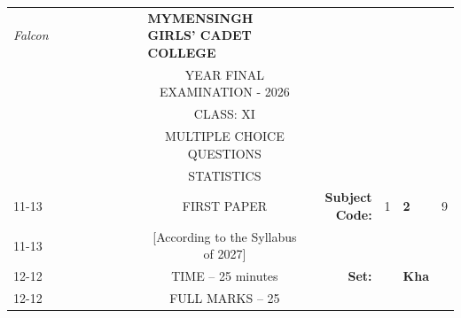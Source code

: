 \documentclass[12pt]{exam}
\begin{document}
\begin{table}[]
\begin{tabular}{llllllllcllll}
\textit{Falcon} &  &  &  &  &  &  &  & \multicolumn{1}{l}{\textbf{MYMENSINGH GIRLS' CADET COLLEGE}} &                                             &                        &                                 &                        \\
                &  &  &  &  &  &  &  & \multicolumn{1}{c}{YEAR FINAL EXAMINATION - 2026}       &                                             &                        & \multicolumn{1}{c}{}            &                        \\
                &  &  &  &  &  &  &  & CLASS: XI                                                   &                                             &                        & \multicolumn{1}{c}{}            &                        \\
                &  &  &  &  &  &  &  & MULTIPLE CHOICE QUESTIONS                                    &                                             &                        & \multicolumn{1}{c}{}            &                        \\
                &  &  &  &  &  &  &  & STATISTICS                                                   &                                             &                        & \multicolumn{1}{r}{}            &                        \\ \cline{11-13} 
                &  &  &  &  &  &  &  & FIRST PAPER                                                 & \multicolumn{1}{r|}{\textbf{Subject Code:}} & \multicolumn{1}{l|}{1} & \multicolumn{1}{l|}{\textbf{2}} & \multicolumn{1}{l|}{9} \\ \cline{11-13} 
                &  &  &  &  &  &  &  & [According to the Syllabus of 2027]                          & \multicolumn{1}{r}{}                        &                        &                                 &                        \\ \cline{12-12}
                &  &  &  &  &  &  &  & TIME – 25 minutes                                            & \multicolumn{1}{r}{\textbf{Set:}}           & \multicolumn{1}{l|}{}  & \multicolumn{1}{l|}{\textbf{Kha}} &                        \\ \cline{12-12}
                &  &  &  &  &  &  &  & FULL MARKS – 25                                              &                                             &                        &                                 &                       
\end{tabular}
\end{table}
\end{document}

